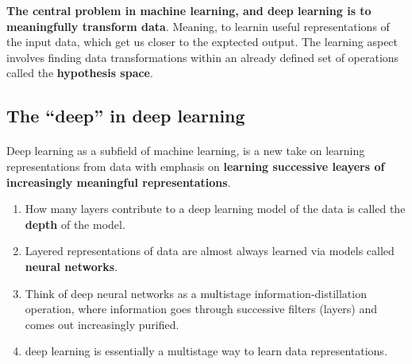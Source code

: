 \documentclass[12pt, a4paper]{article}
\begin{document}
\textbf{The central problem in machine learning, and deep learning is to meaningfully transform data}.
Meaning, to learnin useful representations of the input data, which get us closer to the exptected output.
The learning aspect involves finding data transformations within an already defined set of operations
called the \textbf{hypothesis space}.


\subsection{The ``deep'' in deep learning}
\paragraph*{}
Deep learning as a subfield of machine learning, is a new take
on learning representations from data with emphasis on 
\textbf{learning successive leayers of increasingly meaningful representations}.

\begin{enumerate}
   \item How many layers contribute to a deep learning model of the data is called
   the \textbf{depth} of the model.
   \item Layered representations of data are almost always
   learned via models called \textbf{neural networks}.
   \item Think of deep neural networks as a multistage information-distillation
   operation, where information goes through successive filters (layers) and comes out
   increasingly purified.
   \item deep learning is essentially a multistage way to learn data representations.
\end{enumerate}
 
\end{document}
